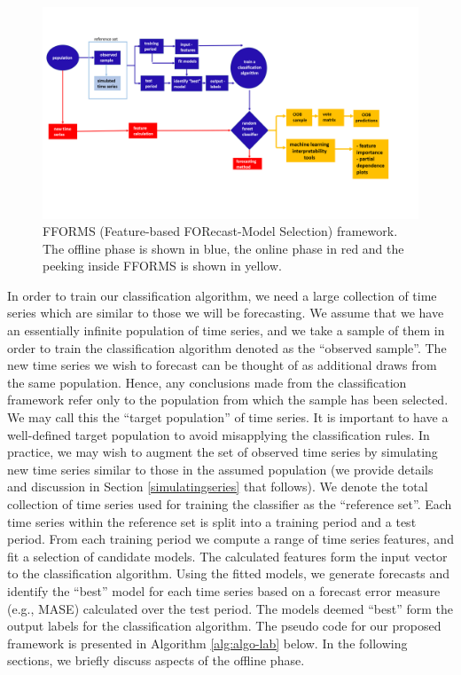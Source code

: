 \documentclass[11pt,a4paper,]{article}
\begin{document}
\begin{figure}

{\centering \includegraphics[width=1.1\linewidth]{images/framework} 

}

\caption{FFORMS (Feature-based FORecast-Model Selection) framework. The offline phase is shown in blue, the online phase in red and the peeking inside FFORMS is shown in yellow.}\label{fig:framework}
\end{figure}

In order to train our classification algorithm, we need a large collection of time series which are similar to those we will be forecasting. We assume that we have an essentially infinite population of time series, and we take a sample of them in order to train the classification algorithm denoted as the ``observed sample''. The new time series we wish to forecast can be thought of as additional draws from the same population. Hence, any conclusions made from the classification framework refer only to the population from which the sample has been selected. We may call this the ``target population'' of time series. It is important to have a well-defined target population to avoid misapplying the classification rules. In practice, we may wish to augment the set of observed time series by simulating new time series similar to those in the assumed population (we provide details and discussion in Section \ref{simulatingseries} that follows). We denote the total collection of time series used for training the classifier as the ``reference set''.
Each time series within the reference set is split into a training period and a test period. From each training period we compute a range of time series features, and fit a selection of candidate models. The calculated features form the input vector to the classification algorithm. Using the fitted models, we generate forecasts and identify the ``best'' model for each time series based on a forecast error measure (e.g., MASE) calculated over the test period. The models deemed ``best'' form the output labels for the classification algorithm. The pseudo code for our proposed framework is presented in Algorithm \ref{alg:algo-lab} below. In the following sections, we briefly discuss aspects of the offline phase.
\end{document}

